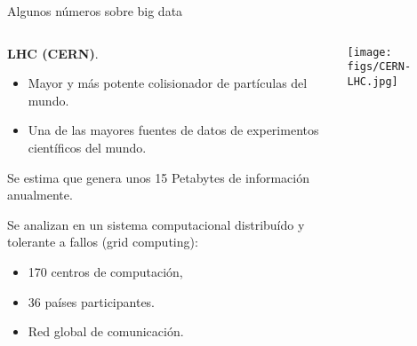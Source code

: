 
\begin{frame}{Algunos números sobre big data}
 \begin{columns}[T]
    \begin{column}{.7\textwidth}
    \begin{wideitemize}
     \item \textbf{LHC (CERN)}.
     \begin{itemize}
      \item Mayor y más potente colisionador de partículas del mundo.
      \item Una de las mayores fuentes de datos de experimentos científicos del
      mundo.
     \end{itemize}

     \item Se estima que genera unos 15 Petabytes de información anualmente.
     \item Se analizan en un sistema computacional distribuído y tolerante a fallos
     (grid computing):
     \begin{itemize}
      \item 170 centros de computación,
      \item 36 países participantes.
      \item Red global de comunicación.
     \end{itemize}

    \end{wideitemize}

    \end{column}
    \begin{column}{.3\textwidth}
    \vspace*{2cm}
    \hspace*{-0.5cm}
    \texttt{[image: figs/CERN-LHC.jpg]}
    \end{column}
  \end{columns}

\end{frame}


